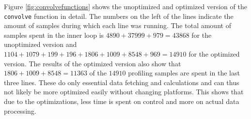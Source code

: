 \documentclass[a4paper]{article}
\begin{document}
Figure \ref{fig:convolvefunctions} shows the unoptimized and optimized version of the \texttt{convolve} function in detail. The numbers on the left of the lines indicate the amount of samples during which each line was running. The total amount of samples spent in the inner loop is $4890 + 37999+ 979 = 43868$ for the unoptimized version and $1104+1079+199+196+1806+1009+8548+969 = 14910$ for the optimized version. The results of the optimized version also show that $1806+1009+8548 = 11363$ of the $14910$ profiling samples are spent in the last three lines. These do only essential data fetching and calculations and can thus not likely be more optimized easily without changing platforms. This shows that due to the optimizations, less time is spent on control and more on actual data processing.\\
\\
\end{document}
